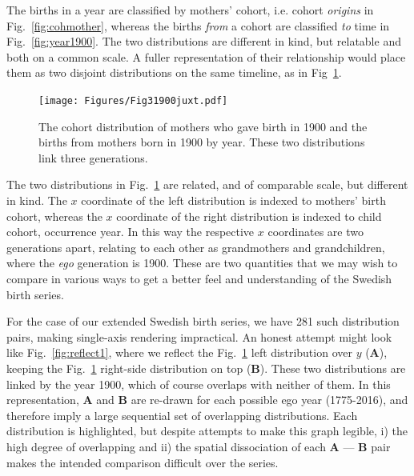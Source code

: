\documentclass{article}
\begin{document}
The births in a year are classified by mothers' cohort, i.e. cohort \emph{origins} in Fig.~\ref{fig:cohmother}, whereas the births \emph{from} a cohort are classified \emph{to} time in Fig.~\ref{fig:year1900}. The two distributions are different in kind, but relatable and both on a common scale. A fuller representation of their relationship would place them as two disjoint distributions on the same timeline, as in Fig~\ref{fig:juxt}.

\begin{figure}[ht!]
 \centering
        \texttt{[image: Figures/Fig31900juxt.pdf]}
        \caption{The cohort distribution of mothers who gave birth in 1900 and the births from mothers born in 1900 by year. These two distributions link three generations.}
          \label{fig:juxt}
\end{figure}

The two distributions in Fig.~\ref{fig:juxt} are related, and of comparable scale, but different in kind. The $x$ coordinate of the left distribution is indexed to mothers' birth cohort, whereas the $x$ coordinate of the right distribution is indexed to child cohort, occurrence year. In this way the respective $x$ coordinates are two generations apart, relating to each other as grandmothers and grandchildren, where the \emph{ego} generation is 1900. These are two quantities that we may wish to compare in various ways to get a better feel and understanding of the Swedish birth series. 

For the case of our extended Swedish birth series, we have 281 such distribution pairs, making single-axis rendering impractical. An honest attempt might look like Fig.~\ref{fig:reflect1}, where we reflect the Fig.~\ref{fig:juxt} left distribution over $y$ (\textbf{A}), keeping the Fig.~\ref{fig:juxt} right-side distribution on top (\textbf{B}). These two distributions are linked by the year 1900, which of course overlaps with neither of them. In this representation, \textbf{A} and \textbf{B} are re-drawn for each possible ego year (1775-2016), and therefore imply a large sequential set of overlapping distributions. Each  distribution is highlighted, but despite attempts to make this graph legible, i) the high degree of overlapping and ii) the spatial dissociation of each \textbf{A} --- \textbf{B} pair makes the intended comparison difficult over the series.
\end{document}
